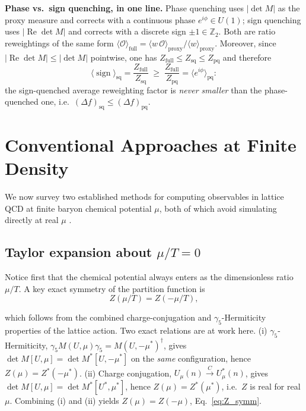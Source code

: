 \documentclass[11pt]{article}
\theoremstyle{definition}
\begin{document}
\textbf{Phase vs.\ sign quenching, in one line.} Phase quenching uses
$|\det M|$ as the proxy measure and corrects with a continuous phase
$e^{i\phi} \in U(1)$; sign quenching uses $|\!\operatorname{Re}\!\det M|$
and corrects with a discrete sign $\pm 1 \in \mathbb{Z}_2$. Both are
ratio reweightings of the same form
$\langle\mathcal{O}\rangle_{\text{full}} =
\langle w\,\mathcal{O}\rangle_{\text{proxy}}/\langle w\rangle_{\text{proxy}}$.
Moreover, since $|\operatorname{Re}\det M| \leq |\det M|$ pointwise, one has
$Z_{\text{full}} \leq Z_{\text{sq}} \leq Z_{\text{pq}}$ and therefore
\begin{equation*}
  \langle\operatorname{sign}\rangle_{\text{sq}}
  = \frac{Z_{\text{full}}}{Z_{\text{sq}}}
  \;\geq\;
  \frac{Z_{\text{full}}}{Z_{\text{pq}}}
  = \langle e^{i\phi}\rangle_{\text{pq}} :
\end{equation*}
the sign-quenched average reweighting factor is \emph{never smaller} than
the phase-quenched one, i.e.\ $(\Delta f)_{\text{sq}} \leq
(\Delta f)_{\text{pq}}$. 

\section{Conventional Approaches at Finite Density}

We now survey two established methods for computing observables in lattice
QCD at finite baryon chemical potential $\mu$, both of which avoid simulating
directly at real $\mu$ \cite{Fodor2002, deForcrand2002, DElia2002}.

\subsection{Taylor expansion about $\mu/T = 0$}
Notice first that the chemical potential always enters as the dimensionless
ratio $\mu/T$. A key exact symmetry of the partition function is
\begin{equation}
  Z(\mu/T) = Z(-\mu/T) ,
  \label{eq:Z_symm}
\end{equation}

which follows from the combined charge-conjugation and $\gamma_5$-Hermiticity
properties of the lattice action. Two exact relations are at work here.
(i) $\gamma_5$-Hermiticity, $\gamma_5 M(U,\mu)\gamma_5 = M(U,-\mu^*)^\dagger$,
gives $\det M[U,\mu] = \det M^*[U,-\mu^*]$ on the \emph{same} configuration,
hence $Z(\mu) = Z^*(-\mu^*)$.
(ii) Charge conjugation, $U_\mu(n)\xrightarrow{C} U_\mu^*(n)$, gives
$\det M[U,\mu] = \det M^*[U^*,\mu^*]$, hence $Z(\mu) = Z^*(\mu^*)$, i.e.\
$Z$ is real for real $\mu$. Combining (i) and (ii) yields
$Z(\mu) = Z(-\mu)$, Eq.~\eqref{eq:Z_symm}.
\end{document}
